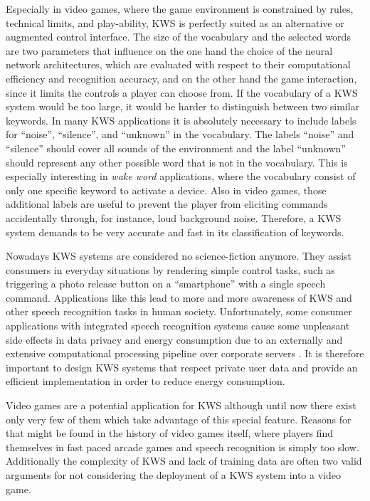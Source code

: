 Especially in video games, where the game environment is constrained by rules, technical limits, and play-ability, KWS is perfectly suited as an alternative or augmented control interface.
The size of the vocabulary and the selected words are two parameters that influence on the one hand the choice of the neural network architectures, which are evaluated with respect to their computational efficiency and recognition accuracy, and on the other hand the game interaction, since it limits the controls a player can choose from.
If the vocabulary of a KWS system would be too large, it would be harder to distinguish between two similar keywords.
In many KWS applications it is absolutely necessary to include labels for \enquote{noise}, \enquote{silence}, and \enquote{unknown} in the vocabulary.
The labels \enquote{noise} and \enquote{silence} should cover all sounds of the environment and the label \enquote{unknown} should represent any other possible word that is not in the vocabulary.
This is especially interesting in \emph{wake word} applications, where the vocabulary consist of only one specific keyword to activate a device.
Also in video games, those additional labels are useful to prevent the player from eliciting commands accidentally through, for instance, loud background noise.
Therefore, a KWS system demands to be very accurate and fast in its classification of keywords.

Nowadays KWS systems are considered no science-fiction anymore.
They assist consumers in everyday situations by rendering simple control tasks, such as triggering a photo release button on a \enquote{smartphone} with a single speech command.
Applications like this lead to more and more awareness of KWS and other speech recognition tasks in human society.
Unfortunately, some consumer applications with integrated speech recognition systems cause some unpleasant side effects in data privacy and energy consumption due to an externally and extensive computational processing pipeline over corporate servers \cite{Tang2018PowerConsKWS}.
It is therefore important to design KWS systems that respect private user data and provide an efficient implementation in order to reduce energy consumption.

Video games are a potential application for KWS although until now there exist only very few of them which take advantage of this special feature.
Reasons for that might be found in the history of video games itself, where players find themselves in fast paced arcade games and speech recognition is simply too slow.
Additionally the complexity of KWS and lack of training data are often two valid arguments for not considering the deployment of a KWS system into a video game.

